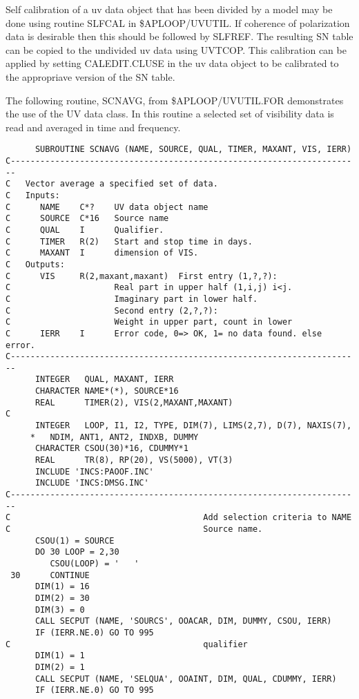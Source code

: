    Self calibration of a uv data object that has been divided by a
model may be done using routine SLFCAL in \$APLOOP/UVUTIL.  If
coherence of polarization data is desirable then this should be
followed by SLFREF.  The resulting SN table can be copied to the
undivided uv data using UVTCOP.  This calibration can be applied by
setting CALEDIT.CLUSE in the uv data object to be calibrated to the
appropriave version of the SN table.

   The following routine, SCNAVG, from \$APLOOP/UVUTIL.FOR
demonstrates the use of the UV data class.  In this routine a selected
set of visibility data is read and averaged in time and frequency.

{\small\begin{verbatim}
      SUBROUTINE SCNAVG (NAME, SOURCE, QUAL, TIMER, MAXANT, VIS, IERR)
C-----------------------------------------------------------------------
C   Vector average a specified set of data.
C   Inputs:
C      NAME    C*?    UV data object name
C      SOURCE  C*16   Source name
C      QUAL    I      Qualifier.
C      TIMER   R(2)   Start and stop time in days.
C      MAXANT  I      dimension of VIS.
C   Outputs:
C      VIS     R(2,maxant,maxant)  First entry (1,?,?):
C                     Real part in upper half (1,i,j) i<j.
C                     Imaginary part in lower half.
C                     Second entry (2,?,?):
C                     Weight in upper part, count in lower
C      IERR    I      Error code, 0=> OK, 1= no data found. else error.
C-----------------------------------------------------------------------
      INTEGER   QUAL, MAXANT, IERR
      CHARACTER NAME*(*), SOURCE*16
      REAL      TIMER(2), VIS(2,MAXANT,MAXANT)
C
      INTEGER   LOOP, I1, I2, TYPE, DIM(7), LIMS(2,7), D(7), NAXIS(7),
     *   NDIM, ANT1, ANT2, INDXB, DUMMY
      CHARACTER CSOU(30)*16, CDUMMY*1
      REAL      TR(8), RP(20), VS(5000), VT(3)
      INCLUDE 'INCS:PAOOF.INC'
      INCLUDE 'INCS:DMSG.INC'
C-----------------------------------------------------------------------
C                                       Add selection criteria to NAME
C                                       Source name.
      CSOU(1) = SOURCE
      DO 30 LOOP = 2,30
         CSOU(LOOP) = '   '
 30      CONTINUE
      DIM(1) = 16
      DIM(2) = 30
      DIM(3) = 0
      CALL SECPUT (NAME, 'SOURCS', OOACAR, DIM, DUMMY, CSOU, IERR)
      IF (IERR.NE.0) GO TO 995
C                                       qualifier
      DIM(1) = 1
      DIM(2) = 1
      CALL SECPUT (NAME, 'SELQUA', OOAINT, DIM, QUAL, CDUMMY, IERR)
      IF (IERR.NE.0) GO TO 995

\end{verbatim}}
